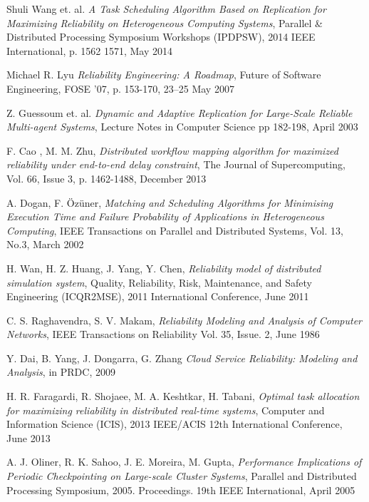 \documentclass{cslthse-msc}
\begin{document}
\begin{thebibliography}{50}
	Shuli Wang et. al.
	\emph{A Task Scheduling Algorithm Based on Replication for Maximizing Reliability on Heterogeneous Computing Systems},
	Parallel \& Distributed Processing Symposium Workshops (IPDPSW), 2014 IEEE International, p. 1562 1571, 
	May 2014

	Michael R. Lyu
	\emph{Reliability Engineering: A Roadmap},
	Future of Software Engineering, FOSE ’07, p. 153-170,
	23–25 May 2007
	
	Z. Guessoum et. al.
	\emph{Dynamic and Adaptive Replication for Large-Scale Reliable Multi-agent Systems},
	Lecture Notes in Computer Science pp 182-198,
	April 2003

	F. Cao , M. M. Zhu,
	\emph{Distributed workflow mapping algorithm for maximized reliability under end-to-end delay constraint},
	The Journal of Supercomputing, Vol. 66, Issue 3, p. 1462-1488,
	December 2013

	A. Dogan, F. Özüner,
	\emph{Matching and Scheduling Algorithms for Minimising Execution Time and Failure Probability of Applications in Heterogeneous Computing},
	IEEE Transactions on Parallel and Distributed Systems, Vol. 13, No.3,
	March 2002

	H. Wan, H. Z. Huang, J. Yang, Y. Chen,
	\emph{Reliability model of distributed simulation system},
	Quality, Reliability, Risk, Maintenance, and Safety Engineering (ICQR2MSE), 2011 International Conference,
	June 2011

	C. S. Raghavendra, S. V. Makam,
	\emph{Reliability Modeling and Analysis of Computer Networks},
	IEEE Transactions on Reliability Vol. 35, Issue. 2,
	June 1986

	Y. Dai, B. Yang, J. Dongarra, G. Zhang
	\emph{Cloud Service Reliability: Modeling and Analysis},
	in PRDC, 2009	

	H. R. Faragardi, R. Shojaee, M. A. Keshtkar, H. Tabani,
	\emph{Optimal task allocation for maximizing reliability in distributed real-time systems},
	Computer and Information Science (ICIS), 2013 IEEE/ACIS 12th International Conference,
	June 2013

	A. J. Oliner, R. K. Sahoo, J. E. Moreira, M. Gupta,
	\emph{Performance Implications of Periodic Checkpointing on Large-scale Cluster Systems},
	Parallel and Distributed Processing Symposium, 2005. Proceedings. 19th IEEE International,
	April 2005


\end{thebibliography}
\end{document}
